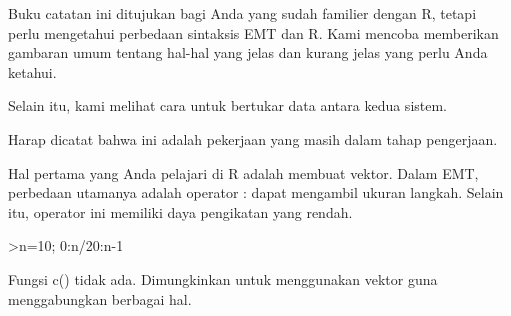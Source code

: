 \documentclass[a4paper,10pt]{article}
\begin{document}
\begin{eulernotebook}
\begin{eulercomment}
\begin{eulercomment}
\begin{eulercomment}
\begin{eulercomment}
\begin{eulercomment}
\begin{eulercomment}
\begin{eulercomment}
\begin{eulercomment}
\begin{eulercomment}
\begin{eulercomment}
\begin{eulercomment}
\begin{eulercomment}
\begin{eulercomment}
\begin{eulercomment}
\begin{eulercomment}
\begin{eulercomment}
\begin{eulercomment}
\begin{eulercomment}
\begin{eulercomment}
\begin{eulercomment}
\begin{eulercomment}
\begin{eulercomment}
\begin{eulercomment}
\begin{eulercomment}
\begin{eulercomment}
\begin{eulercomment}
\begin{eulercomment}
\begin{eulercomment}
\begin{eulercomment}
\begin{eulercomment}
\begin{eulercomment}
\begin{eulercomment}
\begin{eulercomment}
\begin{eulercomment}
\begin{eulercomment}
Buku catatan ini ditujukan bagi Anda yang sudah familier dengan R,
tetapi perlu mengetahui perbedaan sintaksis EMT dan R. Kami mencoba
memberikan gambaran umum tentang hal-hal yang jelas dan kurang jelas
yang perlu Anda ketahui.

Selain itu, kami melihat cara untuk bertukar data antara kedua sistem.
\end{eulercomment}
\begin{eulercomment}
Harap dicatat bahwa ini adalah pekerjaan yang masih dalam tahap
pengerjaan.
\end{eulercomment}
\begin{eulercomment}
Hal pertama yang Anda pelajari di R adalah membuat vektor. Dalam EMT,
perbedaan utamanya adalah operator : dapat mengambil ukuran langkah.
Selain itu, operator ini memiliki daya pengikatan yang rendah.
\end{eulercomment}
\begin{eulerprompt}
>n=10; 0:n/20:n-1
\end{eulerprompt}
\begin{euleroutput}
  [0,  0.5,  1,  1.5,  2,  2.5,  3,  3.5,  4,  4.5,  5,  5.5,  6,  6.5,
  7,  7.5,  8,  8.5,  9]
\end{euleroutput}
\begin{eulercomment}
Fungsi c() tidak ada. Dimungkinkan untuk menggunakan vektor guna
menggabungkan berbagai hal.


\end{eulercomment}
\end{eulercomment}
\end{eulercomment}
\end{eulercomment}
\end{eulercomment}
\end{eulercomment}
\end{eulercomment}
\end{eulercomment}
\end{eulercomment}
\end{eulercomment}
\end{eulercomment}
\end{eulercomment}
\end{eulercomment}
\end{eulercomment}
\end{eulercomment}
\end{eulercomment}
\end{eulercomment}
\end{eulercomment}
\end{eulercomment}
\end{eulercomment}
\end{eulercomment}
\end{eulercomment}
\end{eulercomment}
\end{eulercomment}
\end{eulercomment}
\end{eulercomment}
\end{eulercomment}
\end{eulercomment}
\end{eulercomment}
\end{eulercomment}
\end{eulercomment}
\end{eulercomment}
\end{eulercomment}
\end{eulercomment}
\end{eulercomment}
\end{eulernotebook}
\end{document}
